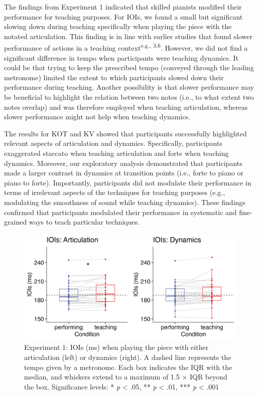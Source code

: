 \documentclass[
  man,floatsintext]{apa6}
\begin{document}
The findings from Experiment 1 indicated that skilled pianists modified their performance for teaching purposes. For IOIs, we found a small but significant slowing down during teaching specifically when playing the piece with the notated articulation. This finding is in line with earlier studies that found slower performance of actions in a teaching context\textsuperscript{e.g., 3,6}. However, we did not find a significant difference in tempo when participants were teaching dynamics. It could be that trying to keep the prescribed tempo (conveyed through the leading metronome) limited the extent to which participants slowed down their performance during teaching. Another possibility is that slower performance may be beneficial to highlight the relation between two notes (i.e., to what extent two notes overlap) and was therefore employed when teaching articulation, whereas slower performance might not help when teaching dynamics.

The results for KOT and KV showed that participants successfully highlighted relevant aspects of articulation and dynamics. Specifically, participants exaggerated staccato when teaching articulation and forte when teaching dynamics. Moreover, our exploratory analysis demonstrated that participants made a larger contrast in dynamics at transition points (i.e., forte to piano or piano to forte). Importantly, participants did not modulate their performance in terms of irrelevant aspects of the techniques for teaching purposes (e.g., modulating the smoothness of sound while teaching dynamics). These findings confirmed that participants modulated their performance in systematic and fine-grained ways to teach particular techniques.

\begin{figure}
\includegraphics[width=1\linewidth]{manuscript_files/figure-latex/plot-ioi-1-1} \caption{\label{fig:ioi-1}Experiment 1: IOIs (ms) when playing the piece with either articulation (left) or dynamics (right). A dashed line represents the tempo given by a metronome. Each box indicates the IQR with the median, and whiskers extend to a maximum of 1.5 × IQR beyond the box. Significance levels: * \textit{p} < .05, ** \textit{p} < .01, *** \textit{p} < .001}\label{fig:plot-ioi-1}
\end{figure}
\end{document}
